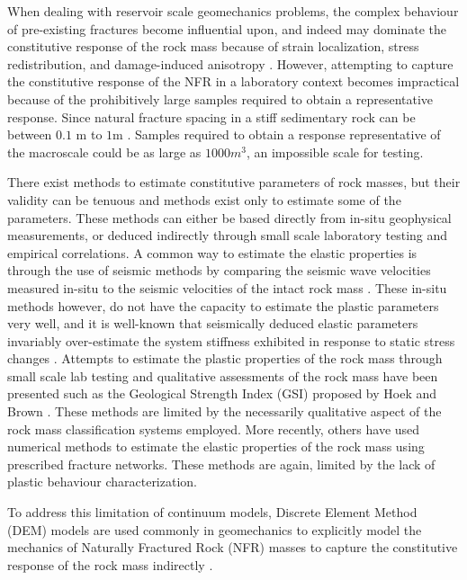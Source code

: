 When dealing with reservoir scale geomechanics problems, the complex behaviour of pre-existing fractures become influential upon, and indeed may dominate the constitutive response of the rock mass because of strain localization, stress redistribution, and damage-induced anisotropy \citep{Petracca_2015}. However, attempting to capture the constitutive response of the NFR in a laboratory context becomes impractical because of the prohibitively large samples required to obtain a representative response. Since natural fracture spacing in a stiff sedimentary rock can be between $0.1$ m to $1$m \citep{Nelson_2001}. Samples required to obtain a response representative of the macroscale could be as large as $1000 m^3$, an impossible scale for testing. 

There exist methods to estimate constitutive parameters of rock masses, but their validity can be tenuous and methods exist only to estimate some of the parameters. These methods can either be based directly from in-situ geophysical measurements, or deduced indirectly through small scale laboratory testing and empirical correlations. A common way to estimate the elastic properties is through the use of seismic methods by comparing the seismic wave velocities measured in-situ to the seismic velocities of the intact rock mass \citep{SJOGREN_1979}. These in-situ methods however, do not have the capacity to estimate the plastic parameters very well, and it is well-known that seismically deduced elastic parameters invariably over-estimate the system stiffness exhibited in response to static stress changes \citep{Barton_2006}. Attempts to estimate the plastic properties of the rock mass through small scale lab testing and qualitative assessments of the rock mass have been presented such as the Geological Strength Index (GSI) proposed by Hoek and Brown \citet{Hoek_1997}. These methods are limited by the necessarily qualitative aspect of the rock mass classification systems employed. More recently, others \citep{Min_2003,Chen_2012,Bidgoli_2013} have used numerical methods to estimate the elastic properties of the rock mass using prescribed fracture networks. These methods are again, limited by the lack of plastic behaviour characterization. 

To address this limitation of continuum models, Discrete Element Method (DEM) models are used commonly in geomechanics to explicitly model the mechanics of Naturally Fractured Rock (NFR) masses to capture the constitutive response of the rock mass indirectly \citep{jing_review_2003}. 

